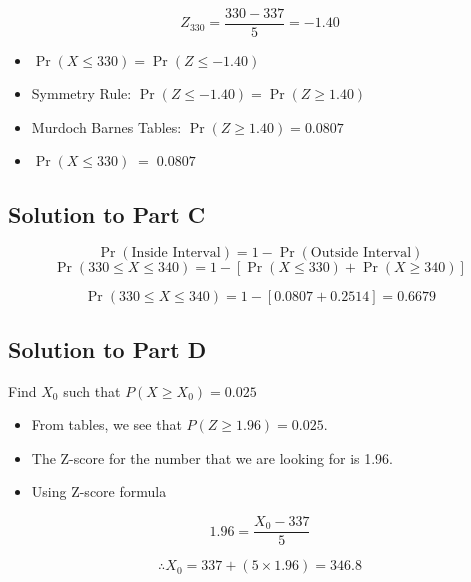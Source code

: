 \[Z_{330} = \frac{330-337}{5} = -1.40\]

\begin{itemize}
    \item $\Pr(X\leq 330) = \Pr(Z \leq -1.40)$
    \item Symmetry Rule: $\Pr(Z \leq -1.40) = \Pr(Z \geq 1.40)$
    \item Murdoch Barnes Tables: $\Pr(Z \geq 1.40) = 0.0807$
    \item $\Pr(X\leq 330) \;=\; 0.0807$
\end{itemize}

\newpage

\subsection*{Solution to Part C}
\[\Pr(\mbox{Inside Interval})= 1 - \Pr(\mbox{Outside Interval}) \]
\[\Pr(330\leq X \leq 340)= 1 - \left[\Pr(X\leq 330) + \Pr(X\geq 340)\right] \]

\[\Pr(330\leq X \leq 340)= 1- [0.0807 +  0.2514] = 0.6679\]



\subsection*{Solution to Part D}
Find $X_0$ such that  $P(X \geq X_0)= 0.025$

\begin{itemize}
\item From tables, we see that $P(Z \geq 1.96) = 0.025$.
\item The Z-score for the number that we are looking for is 1.96.
\item Using Z-score formula
\end{itemize}
\[ 1.96 = \frac{X_0 - 337}{5} \]

\[ \therefore X_0 = 337 + (5 \times 1.96) =  346.8\]








